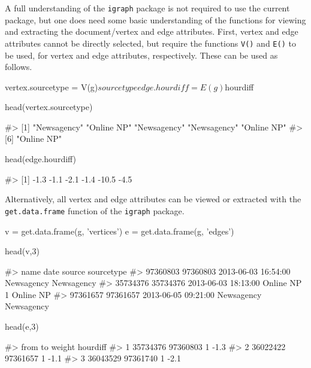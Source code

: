 A full understanding of the \texttt{igraph} package is not required to
use the current package, but one does need some basic understanding of
the functions for viewing and extracting the document/vertex and edge
attributes. First, vertex and edge attributes cannot be directly
selected, but require the functions \texttt{V()} and \texttt{E()} to be
used, for vertex and edge attributes, respectively. These can be used as
follows.

\begin{Schunk}
\begin{Sinput}
vertex.sourcetype = V(g)$sourcetype
edge.hourdiff = E(g)$hourdiff

head(vertex.sourcetype)
\end{Sinput}
\begin{Soutput}
#> [1] "Newsagency" "Online NP"  "Newsagency" "Newsagency" "Online NP" 
#> [6] "Online NP"
\end{Soutput}
\begin{Sinput}
head(edge.hourdiff)
\end{Sinput}
\begin{Soutput}
#> [1]  -1.3  -1.1  -2.1  -1.4 -10.5  -4.5
\end{Soutput}
\end{Schunk}

Alternatively, all vertex and edge attributes can be viewed or extracted
with the \texttt{get.data.frame} function of the \texttt{igraph}
package.

\begin{Schunk}
\begin{Sinput}
v = get.data.frame(g, 'vertices')
e = get.data.frame(g, 'edges')

head(v,3)
\end{Sinput}
\begin{Soutput}
#>              name                date      source sourcetype
#> 97360803 97360803 2013-06-03 16:54:00  Newsagency Newsagency
#> 35734376 35734376 2013-06-03 18:13:00 Online NP 1  Online NP
#> 97361657 97361657 2013-06-05 09:21:00  Newsagency Newsagency
\end{Soutput}
\begin{Sinput}
head(e,3)    
\end{Sinput}
\begin{Soutput}
#>       from       to weight hourdiff
#> 1 35734376 97360803      1     -1.3
#> 2 36022422 97361657      1     -1.1
#> 3 36043529 97361740      1     -2.1
\end{Soutput}
\end{Schunk}

